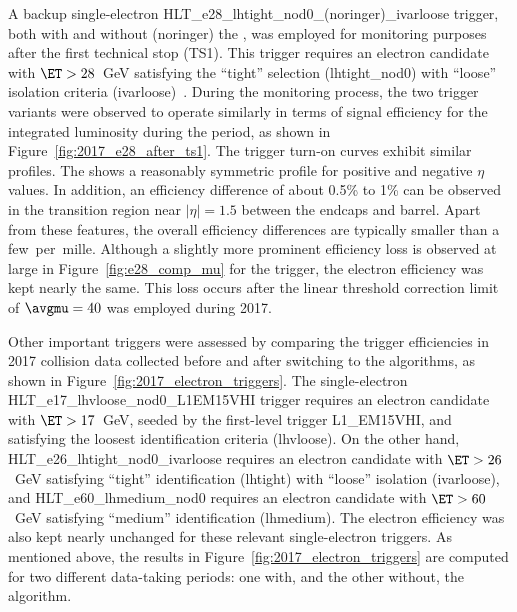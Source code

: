 A backup single-electron HLT\_e28\_lhtight\_nod0\_(noringer)\_ivarloose trigger, both
 with and without (noringer) the \rnn{}, was employed for monitoring purposes after the first technical stop (TS1).
This trigger requires an electron candidate with $\ET > 28$~GeV satisfying the \enquote{tight} selection (lhtight\_nod0) with \enquote{loose} isolation criteria (ivarloose)~\cite{TRIG-2018-05}. 
During the monitoring process, the two trigger variants were observed to operate similarly in terms of signal efficiency for the integrated luminosity during the period, as shown in Figure~\ref{fig:2017_e28_after_ts1}. 
The trigger turn-on curves exhibit similar \ET profiles. The \rnn{} shows a reasonably symmetric profile for positive and negative $\eta$ values. In addition, an efficiency difference of about 0.5\% to 1\% can be observed in the transition region near $|\eta| = 1.5$ between the endcaps and barrel. Apart from these features, the overall efficiency differences are typically smaller than a few~per~mille. Although a slightly more prominent efficiency loss is observed at large \avgmu{} in Figure~\ref{fig:e28_comp_mu} for the \rnn{} trigger, the electron efficiency was kept nearly the same. This loss occurs after the linear threshold correction limit of $\avgmu=40$ was employed during 2017.

Other important triggers were assessed by comparing the trigger efficiencies in 2017 collision data collected before and after switching to the \rnn{} algorithms, as shown in Figure~\ref{fig:2017_electron_triggers}. The single-electron HLT\_e17\_lhvloose\_nod0\_L1EM15VHI trigger requires an electron candidate with $\ET > 17$~GeV, seeded by the first-level trigger L1\_EM15VHI, and satisfying the loosest identification criteria (lhvloose). On the other hand, HLT\_e26\_lhtight\_nod0\_ivarloose requires an electron candidate with $\ET>26$~GeV satisfying \enquote{tight} identification (lhtight) with \enquote{loose} isolation (ivarloose), and HLT\_e60\_lhmedium\_nod0 requires an electron candidate with $\ET>60$~GeV satisfying \enquote{medium} identification (lhmedium). The electron efficiency was also kept nearly unchanged for these relevant single-electron triggers. As mentioned above, the results in Figure~\ref{fig:2017_electron_triggers} are computed for two different data-taking periods: one with, and the other without, the \rnn{} algorithm. 



